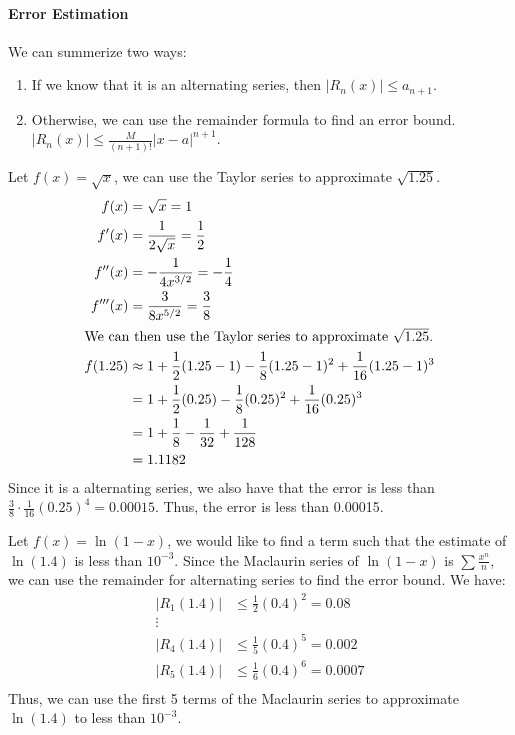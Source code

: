 \documentclass[11pt]{article}
\begin{document}
\paragraph{Error Estimation} We can summerize two ways:
\begin{enumerate}
    \item If we know that it is an alternating series, then $|R_n(x)| \le a_{n+1}$.
    \item Otherwise, we can use the remainder formula to find an error bound. $|R_n(x)| \le \frac{M}{(n+1)!} |x-a|^{n+1}$.
\end{enumerate}
\begin{example}
    Let $f(x) = \sqrt{x}$, we can use the Taylor series to approximate $\sqrt{1.25}$.
    \begin{align*}
        f(x) &= \sqrt{x} = 1\\
        f'(x) &= \frac{1}{2\sqrt{x}} = \frac{1}{2} \\
        f''(x) &= -\frac{1}{4x^{3/2}} = -\frac{1}{4} \\
        f'''(x) &= \frac{3}{8x^{5/2}} = \frac{3}{8} \\
        \intertext{We can then use the Taylor series to approximate $\sqrt{1.25}$.}
        f(1.25) &\approx 1 + \frac{1}{2}(1.25-1) - \frac{1}{8}(1.25-1)^2 + \frac{1}{16}(1.25-1)^3 \\
        &= 1 + \frac{1}{2}(0.25) - \frac{1}{8}(0.25)^2 + \frac{1}{16}(0.25)^3 \\
        &= 1 + \frac{1}{8} - \frac{1}{32} + \frac{1}{128} \\
        &= 1.1182
    \end{align*}
    Since it is a alternating series, we also have that the error is less than $\frac{3}{8} \cdot \frac{1}{16} (0.25)^4 = 0.00015$. Thus, the error is less than 0.00015.
\end{example}
\begin{example}
    Let $f(x) = \ln(1-x)$, we would like to find a term such that the estimate of $\ln(1.4)$ is less than $10^{-3}$. Since the Maclaurin series of $\ln(1-x)$ is $\sum \frac{x^n}{n}$, we can use the remainder for alternating series to find the error bound. We have:
    \begin{align*}
        |R_1(1.4)| &\le \frac{1}{2} (0.4)^2 = 0.08 \\
        \vdots \\
        |R_4(1.4)| &\le \frac{1}{5} (0.4)^5 = 0.002\\
        |R_5(1.4)| &\le \frac{1}{6} (0.4)^6 = 0.0007 \\
    \end{align*}
    Thus, we can use the first 5 terms of the Maclaurin series to approximate $\ln(1.4)$ to less than $10^{-3}$.
\end{example}
\end{document}
